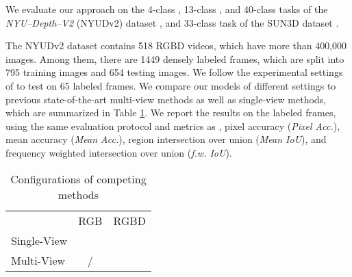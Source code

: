 

We evaluate our approach on the 4-class \cite{Silberman:ECCV12}, 13-class \cite{couprie2013indoor}, and 40-class \cite{gupta2013perceptual} tasks of the \textit{NYU--Depth--V2} (NYUDv2) dataset \cite{Silberman:ECCV12}, and 33-class task of the SUN3D dataset \cite{SUN3D}.

The NYUDv2 dataset contains 518 RGBD videos, which have more than 400,000 images.
Among them, there are 1449 densely labeled frames, which are split into 795 training images and 654 testing images.
{We follow the experimental settings of \cite{deng2015semantic} to test on 65 labeled frames.}
We compare our models of different settings to previous state-of-the-art multi-view methods as well as single-view methods, which are summarized in Table \ref{table:table_competing}.
We report the results on the labeled frames, using the same evaluation protocol and metrics as \cite{long2015fully},
pixel accuracy (\textit{Pixel Acc.}), mean accuracy (\textit{Mean Acc.}), region intersection over union (\textit{Mean IoU}),
and frequency weighted intersection over union (\textit{f.w. IoU}).


\begin{table}[h!]
\scriptsize
  \begin{center}
    \caption{Configurations of competing methods}
    \label{table:table_competing}
    \begin{tabular}{lcc}
      \toprule
       & RGB  & RGBD \\
      \cmidrule(lr){1-1}\cmidrule(lr){2-2}\cmidrule(lr){3-3}
      Single-View & \cite{david2015multiscale,alex2015bayesiansegnet}  & \cite{region_end2end2016eccv,chen2014semantic,chen2016deeplab,deng2015semantic,raghudeep2015spCNN,gupta2014learning,long2015fully,Unsupervised_RGBD_segmentation,specificfeature2016eccv,crfasrnn_iccv2015}   \\
      Multi-View  & / & \cite{couprie2013indoor,hermans2014dense,stuckler2015dense,SemanticFusion}  \\
      \bottomrule
    \end{tabular}
  \end{center}
\end{table}

